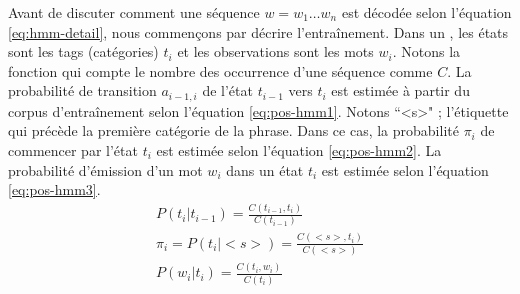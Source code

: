 \documentclass{KodeBook}
\begin{document}
Avant de discuter comment une séquence $w=w_1 \ldots w_n$ est décodée selon l'équation \ref{eq:hmm-detail}, nous commençons par décrire l'entraînement. 
Dans un , les états sont les tags (catégories) $t_i$ et les observations sont les mots $w_i$. 
Notons la fonction qui compte le nombre des occurrence d'une séquence comme $C$.
La probabilité de transition $a_{i-1,i}$ de l'état $t_{i-1}$ vers $t_i$ est estimée à partir du corpus d'entraînement selon l'équation \ref{eq:pos-hmm1}.
Notons ``<s>" ; l'étiquette qui précède la première catégorie de la phrase. 
Dans ce cas, la probabilité $\pi_i$ de commencer par l'état $t_i$ est estimée selon l'équation \ref{eq:pos-hmm2}.
La probabilité d'émission d'un mot $w_i$ dans un état $t_i$ est estimée selon l'équation \ref{eq:pos-hmm3}.
\begin{align}
P(t_i | t_{i-1}) = \frac{C(t_{i-1}, t_i)}{C(t_{i-1})}  \label{eq:pos-hmm1} \\
\pi_i = P(t_i | <s>) = \frac{C(<s>, t_i)}{C(<s>)} \label{eq:pos-hmm2} \\
P(w_i | t_i) = \frac{C(t_i, w_i)}{C(t_i)} \label{eq:pos-hmm3}
\end{align}
\end{document}

